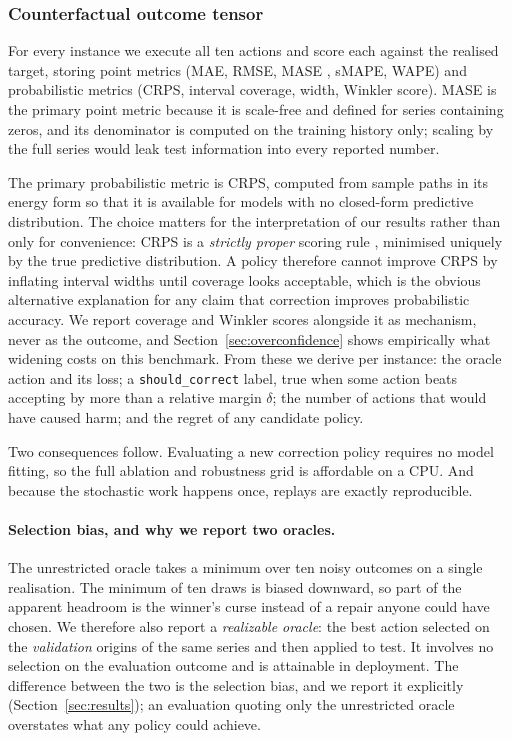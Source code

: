 \subsubsection{Counterfactual outcome tensor}

For every instance we execute all ten actions and score each against the realised
target, storing point metrics (MAE, RMSE, MASE \citep{hyndman2006mase}, sMAPE, WAPE) and
probabilistic metrics (CRPS, interval coverage, width, Winkler score). MASE is the
primary point metric because it is scale-free and defined for series containing zeros,
and its denominator is computed on the training history only; scaling by the full
series would leak test information into every reported number.

The primary probabilistic metric is CRPS, computed from sample paths in its energy form
so that it is available for models with no closed-form predictive distribution. The
choice matters for the interpretation of our results rather than only for convenience:
CRPS is a \emph{strictly proper} scoring rule \citep{gneiting2007crps}, minimised
uniquely by the true predictive distribution. A policy therefore cannot improve CRPS by
inflating interval widths until coverage looks acceptable, which is the obvious
alternative explanation for any claim that correction improves probabilistic accuracy.
We report coverage and Winkler scores alongside it as mechanism, never as the outcome,
and Section~\ref{sec:overconfidence} shows empirically what widening costs on this
benchmark. From these we derive per instance:
the oracle action and its loss; a \texttt{should\_correct} label, true when some action
beats accepting by more than a relative margin $\delta$; the number of actions that
would have caused harm; and the regret of any candidate policy.

Two consequences follow. Evaluating a new correction policy requires no model fitting,
so the full ablation and robustness grid is affordable on a CPU. And because the
stochastic work happens once, replays are exactly reproducible.

\paragraph{Selection bias, and why we report two oracles.}
The unrestricted oracle takes a minimum over ten noisy outcomes on a single
realisation. The minimum of ten draws is biased downward, so part of the apparent
headroom is the winner's curse instead of a repair anyone could have chosen. We
therefore also report a \emph{realizable oracle}: the best action selected on the
\emph{validation} origins of the same series and then applied to test. It involves no
selection on the evaluation outcome and is attainable in deployment. The difference
between the two is the selection bias, and we report it explicitly
(Section~\ref{sec:results}); an evaluation quoting only the unrestricted oracle
overstates what any policy could achieve.

